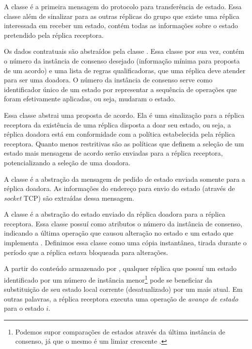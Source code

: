 
A classe  é a primeira mensagem do protocolo para transferência
de estado. Essa classe além de sinalizar para as outras réplicas do grupo que existe uma
réplica interessada em receber um estado, contém todas as informações sobre o estado
pretendido pela réplica receptora.

Os dados contratuais são abstraídos pela classe . Essa classe por sua
vez, contém o número da instância de consenso desejado (informação mínima para proposta de
um acordo) e uma lista de regras qualificadoras, que uma réplica deve atender para ser uma
doadora. O número da instância de consenso serve como identificador único de um estado por
representar a sequência de operações que foram efetivamente aplicadas, ou seja, mudaram o
estado.


Essa classe abstrai uma proposta de acordo. Ela é uma sinalização para a réplica receptora
da existência de uma réplica disposta a doar seu estado, ou seja, a réplica doadora está
em conformidade com a política estabelecida pela réplica receptora. Quanto menos
restritivas são as políticas que definem a seleção de um estado mais mensagens de acordo
serão enviadas para a réplica receptora, potencializando a seleção de uma doadora.


A classe  é a abstração da mensagem de pedido de estado enviada
somente para a réplica doadora. As informações do endereço para envio do estado (através
de \emph{socket} TCP) são extraídas dessa mensagem.


A classe  é a abstração do estado enviado da réplica doadora para
a réplica receptora. Essa classe possuí como atributos o número da instância de consenso,
indicando a última operação que causou alteração no estado e um estado que implementa
. Definimos essa classe como uma cópia instantânea, tirada durante
o período que a réplica estava bloqueada para alterações.

A partir do conteúdo armazenado por , qualquer réplica que possuí
um estado identificado por um número de instância menor\footnote{Podemos supor comparações
de estados através da última instância de consenso, já que o mesmo é um limiar crescente
\cite{vieira-tr10b}.} pode se beneficiar da substituição de seu estado local corrente
(desatualizado) por um mais atual. Em outras palavras, a réplica receptora executa uma
operação de \emph{avanço de estado} para o estado $i$.

